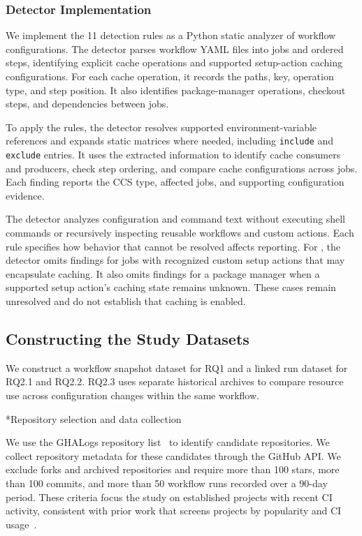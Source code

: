 \documentclass[smallextended]{svjour3}
\makeatletter
\newcommand{\datastepheading}{%
  \@startsection{paragraph}{4}{\z@}{-8pt}{3pt}%
    {\normalfont\normalsize\bfseries}*}
\makeatother
\begin{document}
\subsubsection{Detector Implementation}
\label{subsec:detector}

We implement the 11 detection rules as a Python static analyzer of workflow configurations. The detector parses workflow YAML files into jobs and ordered steps, identifying explicit cache operations and supported setup-action caching configurations. For each cache operation, it records the paths, key, operation type, and step position. It also identifies package-manager operations, checkout steps, and dependencies between jobs.

To apply the rules, the detector resolves supported environment-variable references and expands static matrices where needed, including \texttt{include} and \texttt{exclude} entries. It uses the extracted information to identify cache consumers and producers, check step ordering, and compare cache configurations across jobs. Each finding reports the CCS type, affected jobs, and supporting configuration evidence.

The detector analyzes configuration and command text without executing shell commands or recursively inspecting reusable workflows and custom actions. Each rule specifies how behavior that cannot be resolved affects reporting. For , the detector omits findings for jobs with recognized custom setup actions that may encapsulate caching. It also omits findings for a package manager when a supported setup action's caching state remains unknown. These cases remain unresolved and do not establish that caching is enabled.

\subsection{Constructing the Study Datasets}
\label{sec:data-construction}

We construct a workflow snapshot dataset for RQ1 and a linked run dataset for RQ2.1 and RQ2.2. RQ2.3 uses separate historical archives to compare resource use across configuration changes within the same workflow.

\datastepheading{Repository selection and data collection}

We use the GHALogs repository list~\citep{ghalogs2024,ghalogs_msr25} to identify candidate repositories. We collect repository metadata for these candidates through the GitHub API. We exclude forks and archived repositories and require more than 100 stars, more than 100 commits, and more than 50 workflow runs recorded over a 90-day period. These criteria focus the study on established projects with recent CI activity, consistent with prior work that screens projects by popularity and CI usage~\citep{urdih2026cache}.
\end{document}
